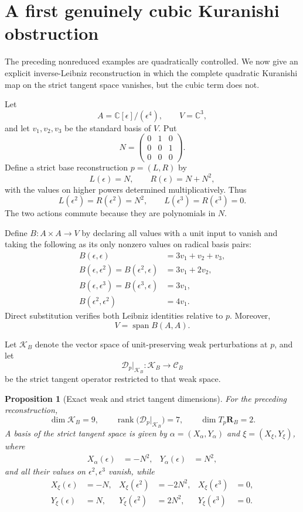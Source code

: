 \documentclass[11pt]{amsart}
\newtheorem{proposition}[theorem]{Proposition}
\newcommand{\Span}{\operatorname{span}}
\newcommand{\rank}{\operatorname{rank}}
\newcommand{\cD}{\mathscr D}
\newcommand{\C}{\mathbb C}
\newcommand{\Rel}{\mathscr C}
\begin{document}
\section{A first genuinely cubic Kuranishi obstruction}\label{sec:cubic-example}

The preceding nonreduced examples are quadratically controlled.  We now give an explicit inverse-Leibniz reconstruction in which the complete quadratic Kuranishi map on the strict tangent space vanishes, but the cubic term does not.

Let
\[
A=\C[\epsilon]/(\epsilon^4),
\qquad
V=\C^3,
\]
and let $v_1,v_2,v_3$ be the standard basis of $V$.  Put
\[
N=
\begin{pmatrix}
0&1&0\\
0&0&1\\
0&0&0
\end{pmatrix}.
\]
Define a strict base reconstruction $p=(L,R)$ by
\[
L(\epsilon)=N,
\qquad
R(\epsilon)=N+N^2,
\]
with the values on higher powers determined multiplicatively.  Thus
\[
L(\epsilon^2)=R(\epsilon^2)=N^2,
\qquad
L(\epsilon^3)=R(\epsilon^3)=0.
\]
The two actions commute because they are polynomials in $N$.

Define $B:A\times A\to V$ by declaring all values with a unit input to vanish and taking the following as its only nonzero values on radical basis pairs:
\begin{align*}
B(\epsilon,\epsilon)&=3v_1+v_2+v_3,\\
B(\epsilon,\epsilon^2)=B(\epsilon^2,\epsilon)&=3v_1+2v_2,\\
B(\epsilon,\epsilon^3)=B(\epsilon^3,\epsilon)&=3v_1,\\
B(\epsilon^2,\epsilon^2)&=4v_1.
\end{align*}
Direct substitution verifies both Leibniz identities relative to $p$.  Moreover,
\[
V=\Span B(A,A).
\]

Let $\mathcal K_B$ denote the vector space of unit-preserving weak perturbations at $p$, and let
\[
\cD_p\big|_{\mathcal K_B}:\mathcal K_B\longrightarrow\Rel_B
\]
be the strict tangent operator restricted to that weak space.

\begin{proposition}[Exact weak and strict tangent dimensions]\label{prop:cubic-tangent}
For the preceding reconstruction,
\[
\dim\mathcal K_B=9,
\qquad
\rank\bigl(\cD_p|_{\mathcal K_B}\bigr)=7,
\qquad
\dim T_p\mathbf R_B=2.
\]
A basis of the strict tangent space is given by $\alpha=(X_\alpha,Y_\alpha)$ and $\xi=(X_\xi,Y_\xi)$, where
\begin{align*}
X_\alpha(\epsilon)&=-N^2,
&Y_\alpha(\epsilon)&=N^2,
\end{align*}
and all their values on $\epsilon^2,\epsilon^3$ vanish, while
\begin{align*}
X_\xi(\epsilon)&=-N,
&X_\xi(\epsilon^2)&=-2N^2,
&X_\xi(\epsilon^3)&=0,\\
Y_\xi(\epsilon)&=N,
&Y_\xi(\epsilon^2)&=2N^2,
&Y_\xi(\epsilon^3)&=0.
\end{align*}
\end{proposition}
\end{document}
